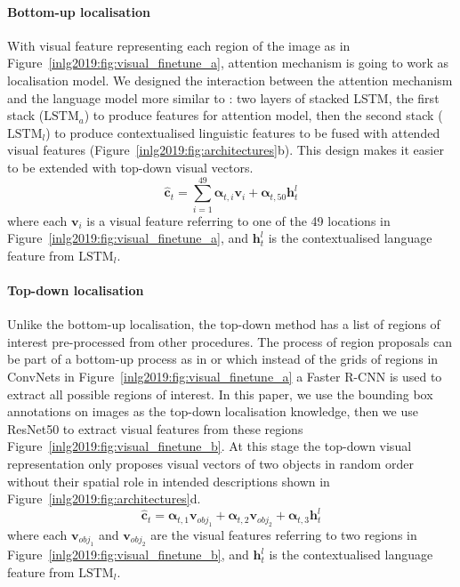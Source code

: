 \paragraph{Bottom-up localisation}
With visual feature representing each region of the image as in Figure~\ref{inlg2019:fig:visual_finetune_a}, attention mechanism is going to work as localisation model. %
We designed the interaction between the attention mechanism and the language model more similar to \cite{anderson2018bottom}: two layers of stacked LSTM, the first stack ($\mathrm{LSTM}_a$) to produce features for attention model, then the second stack ($\mathrm{LSTM}_l$) to produce contextualised linguistic features to be fused with attended visual features (Figure~\ref{inlg2019:fig:architectures}b).
This design makes it easier to be extended with top-down visual vectors.
\begin{equation}
\hat{\bm{c}}_t = \sum_{i=1}^{49} \bm{\alpha}_{t,i} \bm{v}_{i} + \bm{\alpha}_{t,50} {\bm{h}_t^l}
\end{equation}
\noindent where each $\bm{v}_{i}$ is a visual feature referring to one of the 49 locations in Figure~\ref{inlg2019:fig:visual_finetune_a}, and $\bm{h}_t^l$ is the contextualised language feature from $\mathrm{LSTM}_l$. 


\paragraph{Top-down localisation}
Unlike the bottom-up localisation, the top-down method has a list of regions of interest pre-processed from other procedures. 
The process of region proposals can be part of a bottom-up process as in \citet{anderson2018bottom} or \citet{johnson2016densecap} which instead of the grids of regions in ConvNets in Figure~\ref{inlg2019:fig:visual_finetune_a} a Faster R-CNN \cite{ren2015faster} is used to extract all possible regions of interest. 
In this paper, we use the bounding box annotations on images as the top-down localisation knowledge, then we use ResNet50 to extract visual features from these regions Figure~\ref{inlg2019:fig:visual_finetune_b}.
At this stage the top-down visual representation only proposes visual vectors of two objects in random order without their spatial role in intended descriptions shown in Figure~\ref{inlg2019:fig:architectures}d.
\begin{equation}\label{inlg2019:eq:td}
\hat{\bm{c}}_t = \bm{\alpha}_{t,1} \bm{v}_{obj_1} + \bm{\alpha}_{t,2} \bm{v}_{obj_2} + \bm{\alpha}_{t,3} {\bm{h}_t^l}
\end{equation}
\noindent where each $\bm{v}_{obj_1}$ and $\bm{v}_{obj_2}$ are the visual features referring to two regions in Figure~\ref{inlg2019:fig:visual_finetune_b}, and $\bm{h}_t^l$ is the contextualised language feature from $\mathrm{LSTM}_l$. 


